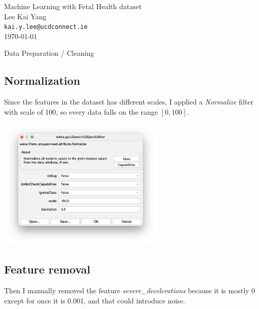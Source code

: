 \documentclass[12pt]{article}
\begin{document}
\begin{center}
    {\LARGE Machine Learning with Fetal Health dataset} \\[0.6cm]

    Lee Kai Yang \\
    \texttt{\small kai.y.lee@ucdconnect.ie} \\[0.3cm]

    \small \today
\end{center}

\begin{section}{Data Preparation / Cleaning}

 \subsection{Normalization}
 Since the features in the dataset has different scales, I applied a
 \textit{Normalize} filter with scale of 100, so every data falls on the
 range $[0, 100]$.

 \begin{center}
     \includegraphics[width=8cm]{images/1_1_normalisation.png}
 \end{center}

 \subsection{Feature removal}
 Then I manually removed the feature \textit{severe\_decelerations} because
 it is mostly 0 except for once it is 0.001, and that could introduce noise.
\end{section}
\end{document}
